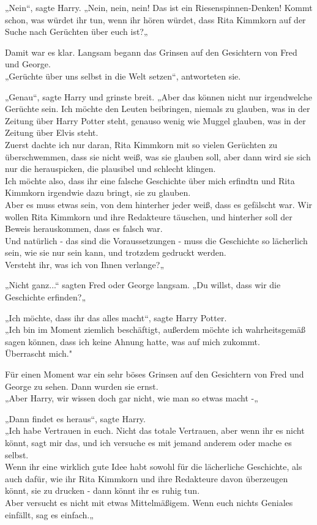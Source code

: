 {„Nein“, sagte Harry. „Nein, nein, nein! Das ist ein Riesenspinnen-Denken! Kommt schon, was würdet ihr tun, wenn ihr hören würdet, dass Rita Kimmkorn auf der Suche nach Gerüchten über euch ist?„

Damit war es klar. Langsam begann das Grinsen auf den Gesichtern von Fred und George.\\ „Gerüchte über uns selbst in die Welt setzen“, antworteten sie.

„Genau“, sagte Harry und grinste breit. „Aber das können nicht nur irgendwelche Gerüchte sein. Ich möchte den Leuten beibringen, niemals zu glauben, was in der Zeitung über Harry Potter steht, genauso wenig wie Muggel glauben, was in der Zeitung über Elvis steht.\\ Zuerst dachte ich nur daran, Rita Kimmkorn mit so vielen Gerüchten zu überschwemmen, dass sie nicht weiß, was sie glauben soll, aber dann wird sie sich nur die herauspicken, die plausibel und schlecht klingen.\\ Ich möchte also, dass ihr eine falsche Geschichte über mich erfindtn und Rita Kimmkorn irgendwie dazu bringt, sie zu glauben.\\ Aber es muss etwas sein, von dem hinterher jeder weiß, dass es gefälscht war. Wir wollen Rita Kimmkorn und ihre Redakteure täuschen, und hinterher soll der Beweis herauskommen, dass es falsch war.\\ Und natürlich - das sind die Voraussetzungen - muss die Geschichte so lächerlich sein, wie sie nur sein kann, und trotzdem gedruckt werden.\\ Versteht ihr, was ich von Ihnen verlange?„

„Nicht ganz...“ sagten Fred oder George langsam. „Du willst, dass wir die Geschichte erfinden?„

„Ich möchte, dass ihr das alles macht“, sagte Harry Potter.\\ „Ich bin im Moment ziemlich beschäftigt, außerdem möchte ich wahrheitsgemäß sagen können, dass ich keine Ahnung hatte, was auf mich zukommt.\\ Überrascht mich."

Für einen Moment war ein sehr böses Grinsen auf den Gesichtern von Fred und George zu sehen. Dann wurden sie ernst.\\ „Aber Harry, wir wissen doch gar nicht, wie man so etwas macht -„

„Dann findet es heraus“, sagte Harry.\\ „Ich habe Vertrauen in euch. Nicht das totale Vertrauen, aber wenn ihr es nicht könnt, sagt mir das, und ich versuche es mit jemand anderem oder mache es selbst.\\ Wenn ihr eine wirklich gute Idee habt sowohl für die lächerliche Geschichte, als auch dafür, wie ihr Rita Kimmkorn und ihre Redakteure davon überzeugen könnt, sie zu drucken - dann könnt ihr es ruhig tun.\\ Aber versucht es nicht mit etwas Mittelmäßigem. Wenn euch nichts Geniales einfällt, sag es einfach.„

}
